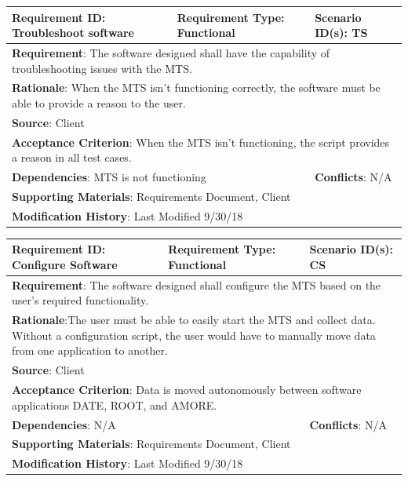\documentclass[12pt]{article}
\begin{document}
\begin{tabular}{|p{5 cm}|p{5 cm}|p{5 cm}|}
	\hline
	\textbf{Requirement ID}: \newline Troubleshoot software & \textbf{Requirement Type}: \newline Functional & \textbf{Scenario ID(s)}: \newline TS 
	\\\hline
	\multicolumn{3}{|p{15cm}|}{\textbf{Requirement}: The software designed shall have the capability of troubleshooting issues with the MTS.}
	\\\hline
	\multicolumn{3}{|p{15cm}|}{\textbf{Rationale}: When the MTS isn’t functioning correctly, the software must be able to provide a reason to the user.}
	\\\hline
	\multicolumn{3}{|p{15cm}|}{\textbf{Source}: Client}
	\\\hline
	\multicolumn{3}{|p{15cm}|}{\textbf{Acceptance Criterion}: When the MTS isn’t functioning, the script provides a reason in all test cases.}
	\\\hline
	\multicolumn{2}{|p{10cm}|}{\textbf{Dependencies}: MTS is not functioning} &
	\textbf{Conflicts}: N/A
	\\\hline
	\multicolumn{3}{|p{15cm}|}{\textbf{Supporting Materials}: Requirements Document, Client}
	\\\hline
	\multicolumn{3}{|p{15cm}|}{\textbf{Modification History}: Last Modified 9/30/18}
	\\\hline
\end{tabular}

\begin{tabular}{|p{5 cm}|p{5 cm}|p{5 cm}|}
	\hline
	\textbf{Requirement ID}: \newline Configure Software & \textbf{Requirement Type}: \newline Functional & \textbf{Scenario ID(s)}: \newline CS 
	\\\hline
	\multicolumn{3}{|p{15cm}|}{\textbf{Requirement}: The software designed shall configure the MTS based on the user’s required functionality.}
	\\\hline
	\multicolumn{3}{|p{15cm}|}{\textbf{Rationale}:The user must be able to easily start the MTS and collect data. Without a configuration script, the user would have to manually move data from one application to another.}
	\\\hline
	\multicolumn{3}{|p{15cm}|}{\textbf{Source}: Client}
	\\\hline
	\multicolumn{3}{|p{15cm}|}{\textbf{Acceptance Criterion}: Data is moved autonomously between software applications DATE, ROOT, and AMORE.}
	\\\hline
	\multicolumn{2}{|p{10cm}|}{\textbf{Dependencies}: N/A} &
	\textbf{Conflicts}: N/A
	\\\hline
	\multicolumn{3}{|p{15cm}|}{\textbf{Supporting Materials}: Requirements Document, Client}
	\\\hline
	\multicolumn{3}{|p{15cm}|}{\textbf{Modification History}: Last Modified 9/30/18}
	\\\hline
\end{tabular}
\end{document}
